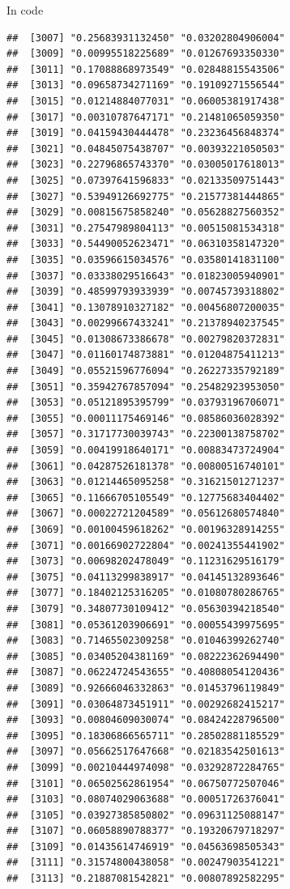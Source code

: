 \documentclass[ignorenonframetext,]{beamer}
\begin{document}
\begin{frame}[fragile]{In code}
\begin{verbatim}
##  [3007] "0.25683931132450" "0.03202804906004"
##  [3009] "0.00995518225689" "0.01267693350330"
##  [3011] "0.17088868973549" "0.02848815543506"
##  [3013] "0.09658734271169" "0.19109271556544"
##  [3015] "0.01214884077031" "0.06005381917438"
##  [3017] "0.00310787647171" "0.21481065059350"
##  [3019] "0.04159430444478" "0.23236456848374"
##  [3021] "0.04845075438707" "0.00393221050503"
##  [3023] "0.22796865743370" "0.03005017618013"
##  [3025] "0.07397641596833" "0.02133509751443"
##  [3027] "0.53949126692775" "0.21577381444865"
##  [3029] "0.00815675858240" "0.05628827560352"
##  [3031] "0.27547989804113" "0.00515081534318"
##  [3033] "0.54490052623471" "0.06310358147320"
##  [3035] "0.03596615034576" "0.03580141831100"
##  [3037] "0.03338029516643" "0.01823005940901"
##  [3039] "0.48599793933939" "0.00745739318802"
##  [3041] "0.13078910327182" "0.00456807200035"
##  [3043] "0.00299667433241" "0.21378940237545"
##  [3045] "0.01308673386678" "0.00279820372831"
##  [3047] "0.01160174873881" "0.01204875411213"
##  [3049] "0.05521596776094" "0.26227335792189"
##  [3051] "0.35942767857094" "0.25482923953050"
##  [3053] "0.05121895395799" "0.03793196706071"
##  [3055] "0.00011175469146" "0.08586036028392"
##  [3057] "0.31717730039743" "0.22300138758702"
##  [3059] "0.00419918640171" "0.00883473724904"
##  [3061] "0.04287526181378" "0.00800516740101"
##  [3063] "0.01214465095258" "0.31621501271237"
##  [3065] "0.11666705105549" "0.12775683404402"
##  [3067] "0.00022721204589" "0.05612680574840"
##  [3069] "0.00100459618262" "0.00196328914255"
##  [3071] "0.00166902722804" "0.00241355441902"
##  [3073] "0.00698202478049" "0.11231629516179"
##  [3075] "0.04113299838917" "0.04145132893646"
##  [3077] "0.18402125316205" "0.01080780286765"
##  [3079] "0.34807730109412" "0.05630394218540"
##  [3081] "0.05361203906691" "0.00055439975695"
##  [3083] "0.71465502309258" "0.01046399262740"
##  [3085] "0.03405204381169" "0.08222362694490"
##  [3087] "0.06224724543655" "0.40808054120436"
##  [3089] "0.92666046332863" "0.01453796119849"
##  [3091] "0.03064873451911" "0.00292682415217"
##  [3093] "0.00804609030074" "0.08424228796500"
##  [3095] "0.18306866565711" "0.28502881185529"
##  [3097] "0.05662517647668" "0.02183542501613"
##  [3099] "0.00210444974098" "0.03292872284765"
##  [3101] "0.06502562861954" "0.06750772507046"
##  [3103] "0.08074029063688" "0.00051726376041"
##  [3105] "0.03927385850802" "0.09631125088147"
##  [3107] "0.06058890788377" "0.19320679718297"
##  [3109] "0.01435614746919" "0.04563698505343"
##  [3111] "0.31574800438058" "0.00247903541221"
##  [3113] "0.21887081542821" "0.00807892582295"

\end{verbatim}
\end{frame}
\end{document}
